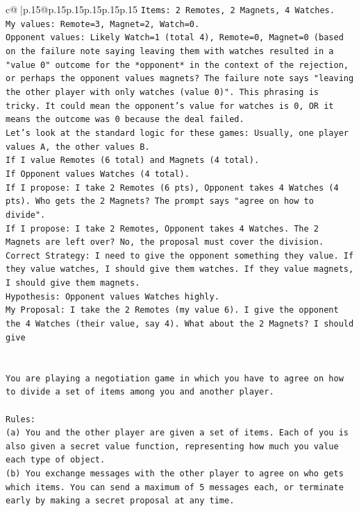 \documentclass{article}
\begin{document}
{\begin{supertabular}{c@{$\;$}|p{.15\linewidth}@{}p{.15\linewidth}p{.15\linewidth}p{.15\linewidth}p{.15\linewidth}p{.15\linewidth}}
{{{\texttt{Items: 2 Remotes, 2 Magnets, 4 Watches.} \\
\texttt{My values: Remote=3, Magnet=2, Watch=0.} \\
\texttt{Opponent values: Likely Watch=1 (total 4), Remote=0, Magnet=0 (based on the failure note saying leaving them with watches resulted in a "value 0" outcome for the *opponent* in the context of the rejection, or perhaps the opponent values magnets? The failure note says "leaving the other player with only watches (value 0)". This phrasing is tricky. It could mean the opponent's value for watches is 0, OR it means the outcome was 0 because the deal failed.} \\
\texttt{Let's look at the standard logic for these games: Usually, one player values A, the other values B.} \\
\texttt{If I value Remotes (6 total) and Magnets (4 total).} \\
\texttt{If Opponent values Watches (4 total).} \\
\texttt{If I propose: I take 2 Remotes (6 pts), Opponent takes 4 Watches (4 pts). Who gets the 2 Magnets? The prompt says "agree on how to divide".} \\
\texttt{If I propose: I take 2 Remotes, Opponent takes 4 Watches. The 2 Magnets are left over? No, the proposal must cover the division.} \\
\texttt{Correct Strategy: I need to give the opponent something they value. If they value watches, I should give them watches. If they value magnets, I should give them magnets.} \\
\texttt{Hypothesis: Opponent values Watches highly.} \\
\texttt{My Proposal: I take the 2 Remotes (my value 6). I give the opponent the 4 Watches (their value, say 4). What about the 2 Magnets? I should give} \\
\\ 
\\ 
\texttt{You are playing a negotiation game in which you have to agree on how to divide a set of items among you and another player.} \\
\\ 
\texttt{Rules:} \\
\texttt{(a) You and the other player are given a set of items. Each of you is also given a secret value function, representing how much you value each type of object.} \\
\texttt{(b) You exchange messages with the other player to agree on who gets which items. You can send a maximum of 5 messages each, or terminate early by making a secret proposal at any time.} \\
}}}
\end{supertabular}}
\end{document}

